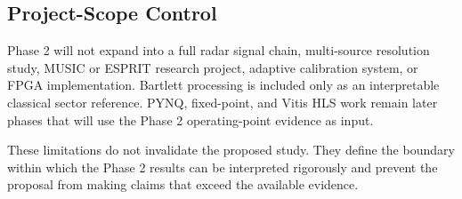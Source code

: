 \subsection{Project-Scope Control}

Phase 2 will not expand into a full radar signal chain, multi-source resolution study, MUSIC or ESPRIT research project, adaptive calibration system, or FPGA implementation. Bartlett processing is included only as an interpretable classical sector reference. PYNQ, fixed-point, and Vitis HLS work remain later phases that will use the Phase 2 operating-point evidence as input.

These limitations do not invalidate the proposed study. They define the boundary within which the Phase 2 results can be interpreted rigorously and prevent the proposal from making claims that exceed the available evidence.